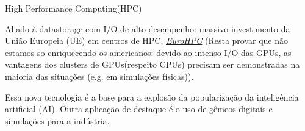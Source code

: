 \documentclass{beamer}
\begin{document}
\begin{frame}{High Performance Computing(HPC)}
		\vspace{0.3cm}
		
		Aliado à datastorage com I/O de alto desempenho: massivo investimento da União Europeia (UE) em centros de HPC, \textcolor{blue}{\emph{\href{https://eurohpc-ju.europa.eu/index_en}{EuroHPC}}}
		(Resta provar que não estamos so enriquecendo os americanos: devido ao intenso I/O das GPUs, as vantagens dos clusters de GPUs(respeito CPUs) precisam ser demonstradas na maioria das situações (e.g. em simulações físicas)).
		
		\vspace{0.3cm}
		Essa nova tecnologia é a base para a explosão da popularização da inteligência artificial (AI). Outra aplicação de destaque é o uso de gêmeos digitais e simulações para a indústria.
		
		
		

	


	\end{frame}
	
\end{document}
